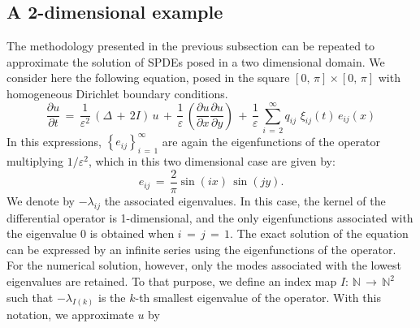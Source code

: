 %         
%
\subsection{A 2-dimensional example}
\label{sub:numerical_example 2D}
The methodology presented in the previous subsection can be repeated to approximate the solution of SPDEs posed in a two dimensional domain. We consider here the following equation, posed in the square $ [ 0,\,{\pi}]{\times}[ 0,\,{\pi}]$ with homogeneous Dirichlet boundary conditions. 
\begin{equation*}
    \frac{{\partial}u}{{\partial}t} \,=\,\frac{1}{{\varepsilon}^2}\, \left( {\Delta}\,+\,2I\right)\,u \,+\, \frac{1}{\varepsilon} \, \left(\frac{{\partial}u}{{\partial}x}\frac{{\partial}u}{{\partial}y}\right) \, +\, \frac{1}{\varepsilon} \, \sum_{ i\,=\,2}^{ {\infty}}  q_{ij}\,\,{\xi}_{ij}(t)\, e_{ij}(x) 
\end{equation*}
In this expressions, $\left\{e_{ij}\right\}_{i\,=\,1}^{\infty}$ are again the eigenfunctions of the operator multiplying $1/{\varepsilon}^2$, which in this two dimensional case are given by:
\begin{equation*}
    e_{ij} \,=\, \frac{2}{\pi} \sin\left(i x\right) \, \sin\left(j y\right).
\end{equation*}
We denote by $-{\lambda}_{ ij }$ the associated eigenvalues. In this case, the kernel of the differential operator is 1-dimensional, and the only eigenfunctions associated with the eigenvalue 0 is obtained when $i\,=\,j\,=\,1$. The exact solution of the equation can be expressed by an infinite series using the eigenfunctions of the operator. For the numerical solution, however, only the modes associated with the lowest eigenvalues are retained. To that purpose, we define an index map $I: \, \mathbb N\, \to \, \mathbb N^2$ such that $-{\lambda}_{I(k)}$ is the $k$-th smallest eigenvalue of the operator. With this notation, we approximate $u$ by
